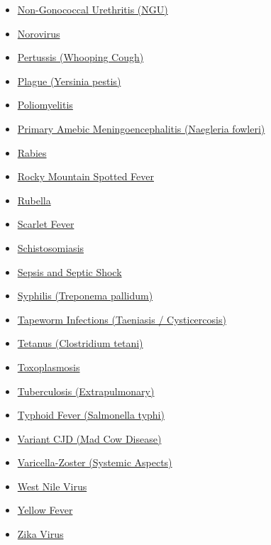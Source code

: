 \begin{itemize}[noitemsep]
  \item \hyperlink{sec:Non-Gonococcal Urethritis}{Non-Gonococcal Urethritis (NGU)}
  \item \hyperlink{sec:Norovirus}{Norovirus}
  \item \hyperlink{sec:Pertussis}{Pertussis (Whooping Cough)}
  \item \hyperlink{sec:Plague}{Plague (Yersinia pestis)}
  \item \hyperlink{sec:Poliomyelitis}{Poliomyelitis}
  \item \hyperlink{sec:Naegleria fowleri}{Primary Amebic Meningoencephalitis (Naegleria fowleri)}
  \item \hyperlink{sec:Rabies}{Rabies}
  \item \hyperlink{sec:Rocky Mountain Spotted Fever}{Rocky Mountain Spotted Fever}
  \item \hyperlink{sec:Rubella}{Rubella}
  \item \hyperlink{sec:Scarlet Fever}{Scarlet Fever}
  \item \hyperlink{sec:Schistosomiasis}{Schistosomiasis}
  \item \hyperlink{sec:Sepsis and Septic Shock}{Sepsis and Septic Shock}
  \item \hyperlink{sec:Syphilis}{Syphilis (Treponema pallidum)}
  \item \hyperlink{sec:Tapeworm Infections}{Tapeworm Infections (Taeniasis / Cysticercosis)}
  \item \hyperlink{sec:Tetanus}{Tetanus (Clostridium tetani)}
  \item \hyperlink{sec:Toxoplasmosis}{Toxoplasmosis}
  \item \hyperlink{sec:Tuberculosis (Extrapulmonary)}{Tuberculosis (Extrapulmonary)}
  \item \hyperlink{sec:Typhoid Fever}{Typhoid Fever (Salmonella typhi)}
  \item \hyperlink{sec:Variant CJD}{Variant CJD (Mad Cow Disease)}
  \item \hyperlink{sec:Varicella-Zoster Systemic}{Varicella-Zoster (Systemic Aspects)}
  \item \hyperlink{sec:West Nile Virus}{West Nile Virus}
  \item \hyperlink{sec:Yellow Fever}{Yellow Fever}
  \item \hyperlink{sec:Zika Virus}{Zika Virus}
\end{itemize}

